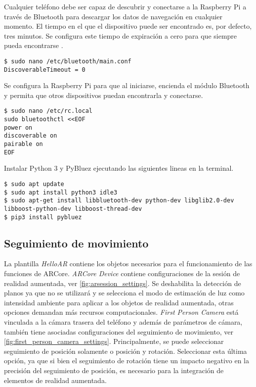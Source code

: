 \documentclass{article}
\newenvironment{standalone}{\begin{preview}}{\end{preview}}
\begin{document}
\begin{standalone}
Cualquier teléfono debe ser capaz de descubrir y conectarse a la Raspberry Pi a través de Bluetooth para descargar los datos de navegación en cualquier momento.
El tiempo en el que el dispositivo puede ser encontrado es, por defecto, tres minutos.
Se configura este tiempo de expiración a cero para que siempre pueda encontrarse \cite{bluetoothDiscoverable}.

\noindent\begin{minipage}{\linewidth}
\begin{lstlisting}
$ sudo nano /etc/bluetooth/main.conf
DiscoverableTimeout = 0
\end{lstlisting}
\end{minipage}

Se configura la Raspberry Pi para que al iniciarse, encienda el módulo Bluetooth y permita que otros dispositivos puedan encontrarla y conectarse.

\par\noindent\begin{minipage}{\linewidth}
\begin{lstlisting}
$ sudo nano /etc/rc.local
sudo bluetoothctl <<EOF
power on
discoverable on
pairable on
EOF
\end{lstlisting}
\end{minipage}

Instalar Python 3 y PyBluez ejecutando las siguientes lineas en la terminal.

\noindent\begin{minipage}{\linewidth}
\begin{lstlisting}
$ sudo apt update
$ sudo apt install python3 idle3
$ sudo apt-get install libbluetooth-dev python-dev libglib2.0-dev libboost-python-dev libboost-thread-dev
$ pip3 install pybluez
\end{lstlisting}
\end{minipage}

\subsection{Seguimiento de movimiento}

La plantilla \textit{HelloAR} \cite{helloAR} contiene los objetos necesarios para el funcionamiento de las funciones de ARCore.
\textit{ARCore Device} contiene configuraciones de la sesión de realidad aumentada, ver \cref{fig:arsession_settings}.
Se deshabilita la detección de planos ya que no se utilizará y se selecciona el modo de estimación de luz como intensidad ambiente para aplicar a los objetos de realidad aumentada, otras opciones demandan más recursos computacionales.
\textit{First Person Camera} está vinculada a la cámara trasera del teléfono y además de parámetros de cámara, también tiene asociadas configuraciones del seguimiento de movimiento, ver \cref{fig:first_person_camera_settings}.
Principalmente, se puede seleccionar seguimiento de posición solamente o posición y rotación.
Seleccionar esta última opción, ya que si bien el seguimiento de rotación tiene un impacto negativo en la precisión del seguimiento de posición, es necesario para la integración de elementos de realidad aumentada.


\end{standalone}
\end{document}
